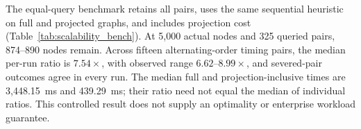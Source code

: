 The equal-query benchmark retains all pairs, uses the same sequential heuristic on full and projected graphs, and includes projection cost (Table~\ref{tab:scalability_bench}). At 5,000 actual nodes and 325 queried pairs, 874--890 nodes remain. Across fifteen alternating-order timing pairs, the median per-run ratio is $7.54\times$, with observed range $6.62$--$8.99\times$, and severed-pair outcomes agree in every run. The median full and projection-inclusive times are 3,448.15~ms and 439.29~ms; their ratio need not equal the median of individual ratios. This controlled result does not supply an optimality or enterprise workload guarantee.
